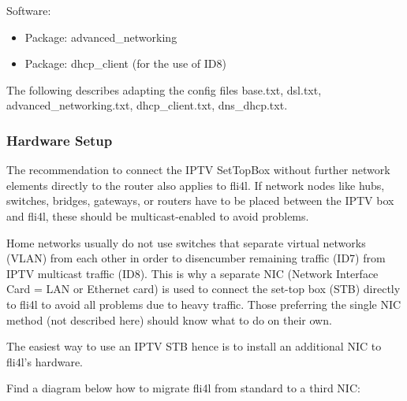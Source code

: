 Software:
\begin{itemize}
   \item{Package: advanced\_networking}
   \item{Package: dhcp\_client (for the use of ID8)}
\end{itemize}

The following describes adapting the config files base.txt, dsl.txt, advanced\_networking.txt, dhcp\_client.txt, dns\_dhcp.txt.

\subsubsection{Hardware Setup}

The recommendation to connect the IPTV SetTopBox without further network elements directly
to the router also applies to fli4l. If network nodes like hubs, switches, bridges, gateways,
or routers have to be placed between the IPTV box and fli4l, these should be multicast-enabled
to avoid problems.

Home networks usually do not use switches that separate virtual networks (VLAN) from each
other in order to disencumber remaining traffic (ID7) from IPTV multicast traffic (ID8).
This is why a separate NIC (Network Interface Card = LAN or Ethernet card) is used to
connect the set-top box (STB) directly to fli4l to avoid all problems due to heavy traffic.
Those preferring the single NIC method (not described here) should know what to do on their own.

The easiest way to use an IPTV STB hence is to install an additional NIC to fli4l's hardware.

Find a diagram below how to migrate fli4l from standard to a third NIC:


